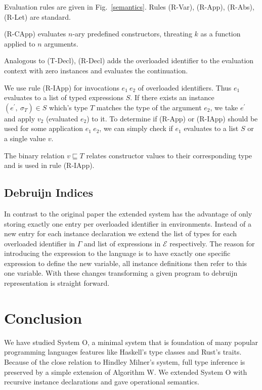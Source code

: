 \documentclass[runningheads]{llncs}
\newcommand{\snip}[1]{\footnotesize{\ttfamily{#1}}}
\begin{document}
\noindent Evaluation rules are given in Fig.~\ref{semantics}. Rules (R-Var), (R-App), (R-Abs), (R-Let) are standard. 

(R-CApp) evaluates $n$-ary predefined constructors, threating $k$ as a function applied to $n$ arguments. 

Analogous to (T-Decl), (R-Decl) adds the overloaded identifier to the evaluation context with zero instances and evaluates the continuation.

We use rule (R-IApp) for invocations $e_1 \ e_2$ of overloaded identifiers.
Thus $e_1$ evaluates to a list of typed expressions $S$. 
If there exists an instance $(e^\prime, \ \sigma_T) \in S$ which's type $T$ matches the type of the argument $e_2$, we take $e^\prime$ and apply $v_2$ (evaluated $e_2$) to it.
To determine if (R-App) or (R-IApp) should be used for some application $e_1 \ e_2$, we can simply check if $e_1$ evaluates to a list $S$ or a single value $v$. 

The binary relation $v \sqsubseteq T$ relates constructor values to their corresponding type and is used in rule (R-IApp).

\subsection{Debruijn Indices}
In contrast to the original paper the extended system has the advantage of only storing exactly one entry per overloaded identifier in environments. 
Instead of a new entry for each instance declaration we extend the list of types for each overloaded identifier in $\Gamma$ and list of expressions in $\mathcal{E}$ respectively.
The reason for introducing the \snip{decl} expression to the language is to have exactly one specific expression to define the new variable, all instance definitions then refer to this one variable. 
With these changes transforming a given program to debruijn representation is straight forward.

\section{Conclusion}
We have studied System O, a minimal system that is foundation of many popular programming languages features like Haskell's type classes and Rust's traits. 
Because of the close relation to Hindley Milner's system, full type inference is preserved by a simple extension of Algorithm W. 
We extended System O with recursive instance declarations and gave operational semantics.
\end{document}
